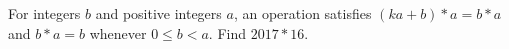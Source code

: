 For integers $b$ and positive integers $a$, an operation satisfies $(ka+b)*a=b*a$ and $b*a=b$ whenever $0\le b<a$. Find $2017*16$.
